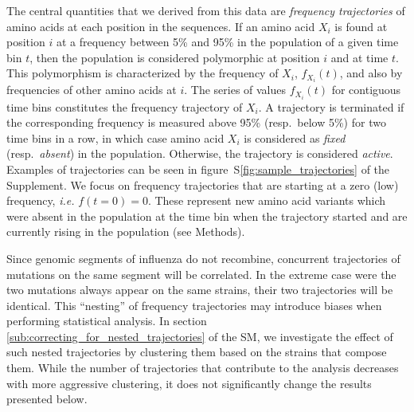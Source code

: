 \documentclass[reprint,amsmath,amssymb,superscriptaddress,showpacs,rmp]{revtex4-1}
\newcommand{\sref}[1]{S\ref{#1}}
\begin{document}
The central quantities that we derived from this data are \emph{frequency trajectories} of amino acids at each position in the sequences. If an amino acid $X_i$ is found at position $i$ at a frequency between 5\% and 95\% in the population of a given time bin $t$, then the population is considered polymorphic at position $i$ and at time $t$. This polymorphism is characterized by the frequency of $X_i$, $f_{X_i}(t)$, and also by frequencies of other amino acids at $i$. The series of values $f_{X_i}(t)$ for contiguous time bins constitutes the frequency trajectory of $X_i$. A trajectory is terminated if the corresponding frequency is measured above 95\% (resp.~below 5\%) for two time bins in a row, in which case amino acid $X_i$ is considered as \emph{fixed} (resp.~\emph{absent}) in the population. Otherwise, the trajectory is considered \emph{active}. Examples of trajectories can be seen in figure~\sref{fig:sample_trajectories} of the Supplement.
We focus on frequency trajectories that are starting at a zero (low) frequency, \emph{i.e.} $f(t=0)=0$.
These represent new amino acid variants which were absent in the population at the time bin when the trajectory started and are currently rising in the population (see Methods).

Since genomic segments of influenza do not recombine, concurrent trajectories of mutations on the same segment will be correlated.
In the extreme case were the two mutations always appear on the same strains, their two trajectories will be identical.
This ``nesting'' of frequency trajectories may introduce biases when performing statistical analysis.
In section \ref{sub:correcting_for_nested_trajectories} of the SM, we investigate the effect of such nested trajectories by clustering them based on the strains that compose them.
While the number of trajectories that contribute to the analysis decreases with more aggressive clustering, it does not significantly change the results presented below.

\end{document}
